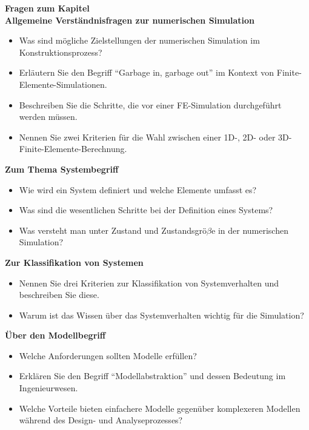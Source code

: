 
\begin{framed}
\textbf{Fragen zum Kapitel}\\
\textbf{Allgemeine Verständnisfragen zur numerischen Simulation}

\begin{itemize}
\item Was sind mögliche Zielstellungen der numerischen Simulation im Konstruktionsprozess?
\item Erläutern Sie den Begriff ``Garbage in, garbage out'' im Kontext von Finite-Elemente-Simulationen.
\item Beschreiben Sie die Schritte, die vor einer FE-Simulation durchgeführt werden müssen.
\item Nennen Sie zwei Kriterien für die Wahl zwischen einer 1D-, 2D- oder 3D-Finite-Elemente-Berechnung.
\end{itemize}

\textbf{Zum Thema Systembegriff}

\begin{itemize}
\item Wie wird ein System definiert und welche Elemente umfasst es?
\item Was sind die wesentlichen Schritte bei der Definition eines Systems?
\item Was versteht man unter Zustand und Zustandsgrö$\beta$e in der numerischen Simulation?
\end{itemize}

\textbf{Zur Klassifikation von Systemen}

\begin{itemize}
\item Nennen Sie drei Kriterien zur Klassifikation von Systemverhalten und beschreiben Sie diese.
\item Warum ist das Wissen über das Systemverhalten wichtig für die Simulation?
\end{itemize}

\textbf{Über den Modellbegriff}

\begin{itemize}
\item Welche Anforderungen sollten Modelle erfüllen?
\item Erklären Sie den Begriff ``Modellabstraktion'' und dessen Bedeutung im Ingenieurwesen.
\item Welche Vorteile bieten einfachere Modelle gegenüber komplexeren Modellen während des Design- und Analyseprozesses?
\end{itemize}


\end{framed}
